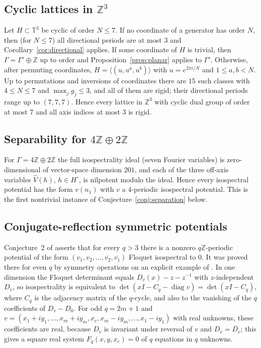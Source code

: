 \documentclass[11pt,reqno]{amsart}
\theoremstyle{definition}
\theoremstyle{remark}
\newcommand{\Z}{\mathbb Z}
\newcommand{\T}{\mathbb T}
\DeclareMathOperator{\diag}{diag}
\begin{document}
\subsection{Cyclic lattices in \texorpdfstring{$\Z^3$}{Z3}}
Let $H\subset\T^3$ be cyclic of order $N\le7$.  If no coordinate of a generator
has order $N$, then (for $N\le7$) all directional periods are at most $3$ and
Corollary~\ref{cor:directional} applies.  If some coordinate of $H$ is trivial, then $\Gamma=\Gamma'\oplus\Z$ up to order
and Proposition~\ref{prop:planar} applies to $\Gamma'$.  Otherwise, after
permuting coordinates, $H=\langle(u,u^a,u^b)\rangle$ with $u=e^{2\pi i/N}$ and
$1\le a,b<N$.  Up to permutations and
inversions of coordinates there are $15$ such classes with $4\le N\le7$ and
$\max_jg_j\le3$, and all of them are rigid; their directional periods range up
to $(7,7,7)$.  Hence every lattice in $\Z^3$ with cyclic dual group of order at
most $7$ and all axis indices at most $3$ is rigid.

\subsection{Separability for \texorpdfstring{$4\Z\oplus2\Z$}{4Z+2Z}}
For $\Gamma=4\Z\oplus2\Z$ the full isospectrality ideal (seven Fourier
variables) is zero-dimensional of vector-space dimension $201$, and each of the
three off-axis variables $\widehat V(h)$, $h\in H^\circ$, is nilpotent modulo the
ideal.  Hence every isospectral potential has the form $v(n_1)$ with $v$ a
$4$-periodic isospectral potential.  This is the first nontrivial instance of
Conjecture~\ref{conj:separation} below.

\subsection{Conjugate-reflection symmetric potentials}
Conjecture~2 of \cite{FFORS2026} asserts that for every $q>3$ there is a nonzero
$q\Z$-periodic potential of the form $(v_1,v_2,\dots,\overline{v_2},\overline{v_1})$
Floquet isospectral to $0$.  It was proved there for even $q$ by symmetry
operations on an explicit example of \cite{FaustEtAl2024}.  In one dimension the
Floquet determinant equals $D_v(x)-z-z^{-1}$ with $z$-independent $D_v$, so
isospectrality is equivalent to
$\det(xI-C_q-\diag v)=\det(xI-C_q)$, where $C_q$ is the adjacency matrix of the
$q$-cycle, and also to the vanishing of the $q$ coefficients of $D_v-D_0$.  For
odd $q=2m+1$ and $v=(x_1+iy_1,\dots,x_m+iy_m,x_c,x_m-iy_m,\dots,x_1-iy_1)$ with
real unknowns, these coefficients are real, because $D_v$ is invariant under
reversal of $v$ and $D_{\overline v}=\overline{D_v}$; this gives a square real
system $F_q(x,y,x_c)=0$ of $q$ equations in $q$ unknowns.
\end{document}
